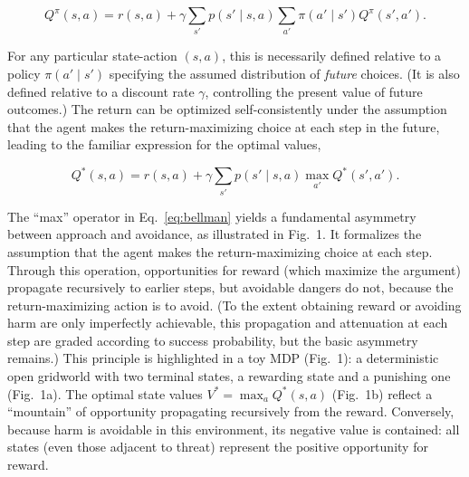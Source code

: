 \documentclass[11pt]{article} %
\begin{document}
\begin{equation}\label{eq:bellman_full}
Q^\pi(s,a) = r(s,a) + \gamma \sum_{s'} p(s' \mid s,a) \sum_{a'} \pi(a' \mid s') Q^\pi(s',a').
\end{equation}

For any particular state-action $(s,a)$, this is necessarily defined relative to a policy $\pi(a' \mid s')$ specifying the assumed distribution of \emph{future} choices. (It is also defined relative to a discount rate $\gamma$, controlling the present value of future outcomes.) The return can be optimized self-consistently under the assumption that the agent makes the return-maximizing choice at each step in the future, leading to the familiar expression for the optimal values,

\begin{equation}\label{eq:bellman}
 Q^*(s,a) = r(s,a) + \gamma \sum_{s'} p(s' \mid s,a) \max_{a'} Q^*(s',a').
\end{equation}

The ``max'' operator in Eq.~\ref{eq:bellman} yields a fundamental asymmetry between approach and avoidance, as illustrated in Fig.~1. It formalizes the assumption that the agent makes the return-maximizing choice at each step. Through this operation, opportunities for reward (which maximize the argument) propagate recursively to earlier steps, but avoidable dangers do not, because the return-maximizing action is to avoid. (To the extent obtaining reward or avoiding harm are only imperfectly achievable, this propagation and attenuation at each step are graded according to success probability, but the basic asymmetry remains.) This principle is highlighted in a toy MDP (Fig.~1): a deterministic open gridworld with two terminal states, a rewarding state and a punishing one (Fig.~1a). The optimal state values $V^* = \max_a Q^*(s,a)$ (Fig.~1b) reflect a ``mountain'' of opportunity propagating recursively from the reward. Conversely, because harm is avoidable in this environment, its negative value is contained: all states (even those adjacent to threat) represent the positive opportunity for reward.
\end{document}
